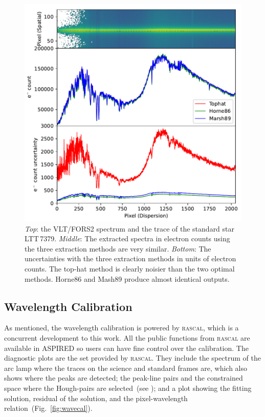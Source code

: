\documentclass[linenumbers, twocolumn]{aastex631}
\begin{document}
\begin{figure}
    \centering
    \includegraphics[width=\columnwidth]{fig_04_extraction_compared.pdf}
    \caption{\textit{Top}: the VLT/FORS2 spectrum and the trace of the standard
    star LTT\,7379. \textit{Middle}: The extracted spectra in electron counts
    using the three extraction methods are very similar. \textit{Bottom}: The
    uncertainties with the three extraction methods in units of electron counts.
    The top-hat method is clearly noisier than the two optimal methods.
    Horne86 and Mash89 produce almost identical outputs.}
    \label{fig:extraction_compared}
\end{figure}

\subsection{Wavelength Calibration}
As mentioned, the wavelength calibration is powered by \textsc{rascal}, which is a concurrent
development to this work. All the public functions from \textsc{rascal} are
available in \textsc{ASPIRED} so users can have fine control over the
calibration. The diagnostic plots are the set provided by \textsc{rascal}.
They include the spectrum of the arc lamp where the traces on the science and
standard frames are, which also shows where the peaks are detected; the
peak-line pairs and the constrained space where the Hough-pairs are
selected~(see \citealt{2020ASPC..527..627V}); and a plot showing the fitting
solution, residual of the solution, and the pixel-wavelength
relation~(Fig.~\ref{fig:wavecal}).
\end{document}
